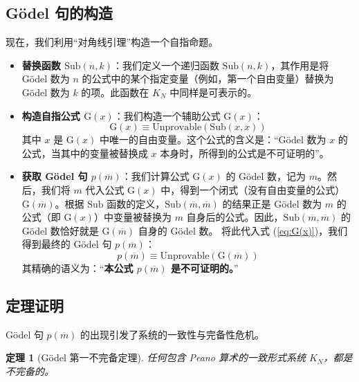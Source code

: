 \documentclass[a4paper,12pt]{ctexart}
\newtheorem{theorem}{定理}[section]
\begin{document}
\subsection{Gödel 句的构造}
现在，我们利用“对角线引理”构造一个自指命题。
\begin{itemize}[leftmargin=*,noitemsep,topsep=0pt]
    \item \textbf{替换函数 $\text{Sub}(n, k)$}：我们定义一个递归函数 $\text{Sub}(n, k)$，其作用是将 Gödel 数为 $n$ 的公式中的某个指定变量（例如，第一个自由变量）替换为 Gödel 数为 $k$ 的项。此函数在 $K_N$ 中同样是可表示的。
    \item \textbf{构造自指公式 $\text{G}(x)$}：我们构造一个辅助公式 $\text{G}(x)$：
    \begin{equation}
        \text{G}(x) \equiv \text{Unprovable}(\text{Sub}(x, x)) \label{eq:G(x)}
    \end{equation}
    其中 $x$ 是 $\text{G}(x)$ 中唯一的自由变量。这个公式的含义是：“Gödel 数为 $x$ 的公式，当其中的变量被替换成 $x$ 本身时，所得到的公式是不可证明的”。
    \item \textbf{获取 Gödel 句 $p(\overline{m})$}：我们计算公式 $\text{G}(x)$ 的 Gödel 数，记为 $m$。然后，我们将 $m$ 代入公式 $\text{G}(x)$ 中，得到一个闭式（没有自由变量的公式）$\text{G}(\overline{m})$。根据 $\text{Sub}$ 函数的定义，$\text{Sub}(\overline{m}, \overline{m})$ 的结果正是 Gödel 数为 $m$ 的公式（即 $\text{G}(x)$）中变量被替换为 $m$ 自身后的公式。因此，$\text{Sub}(\overline{m}, \overline{m})$ 的 Gödel 数恰好就是 $\text{G}(\overline{m})$ 自身的 Gödel 数。
    将此代入式 (\ref{eq:G(x)})，我们得到最终的 Gödel 句 $p(\overline{m})$：
    \begin{equation}
        p(\overline{m}) \equiv \text{Unprovable}(\text{G}(\overline{m})) \label{eq:godel_sentence}
    \end{equation}
    其精确的语义为：“\textbf{本公式 $p(\overline{m})$ 是不可证明的。}”
\end{itemize}

\subsection{定理证明}
Gödel 句 $p(\overline{m})$ 的出现引发了系统的一致性与完备性危机。

\begin{theorem}[Gödel 第一不完备定理]
任何包含 Peano 算术的一致形式系统 $K_N$，都是不完备的。
\end{theorem}
\end{document}
